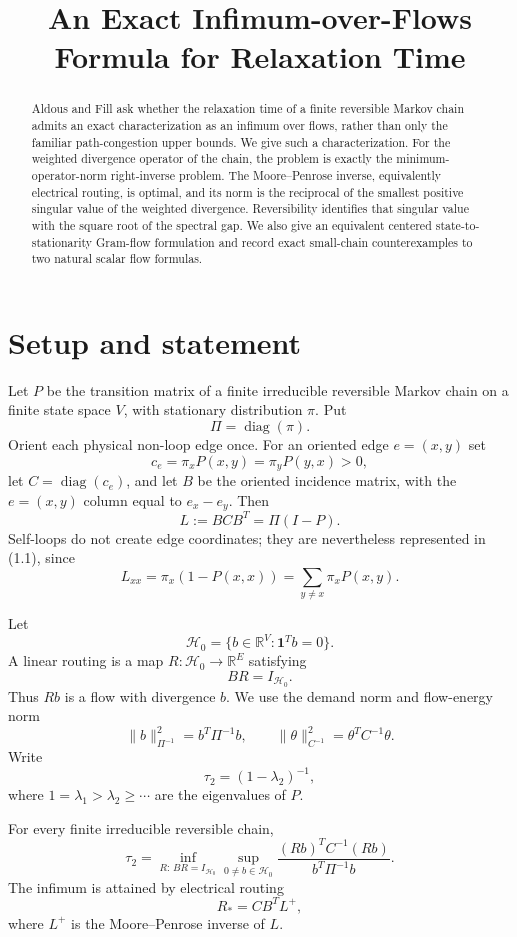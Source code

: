 \documentclass[11pt]{article}
\title{An Exact Infimum-over-Flows Formula for Relaxation Time}
\date{}
\newcommand{\R}{\mathbb{R}}
\newcommand{\cH}{\mathcal H}
\newcommand{\one}{\mathbf 1}
\begin{document}
\maketitle

\begin{abstract}
Aldous and Fill ask whether the relaxation time of a finite reversible Markov chain admits an exact characterization as an infimum over flows, rather than only the familiar path-congestion upper bounds. We give such a characterization. For the weighted divergence operator of the chain, the problem is exactly the minimum-operator-norm right-inverse problem. The Moore--Penrose inverse, equivalently electrical routing, is optimal, and its norm is the reciprocal of the smallest positive singular value of the weighted divergence. Reversibility identifies that singular value with the square root of the spectral gap. We also give an equivalent centered state-to-stationarity Gram-flow formulation and record exact small-chain counterexamples to two natural scalar flow formulas.
\end{abstract}

\section{Setup and statement}
Let $P$ be the transition matrix of a finite irreducible reversible Markov chain on a finite state space $V$, with stationary distribution $\pi$. Put
\[
\Pi=\operatorname{diag}(\pi).
\]
Orient each physical non-loop edge once. For an oriented edge $e=(x,y)$ set
\[
c_e=\pi_xP(x,y)=\pi_yP(y,x)>0,
\]
let $C=\operatorname{diag}(c_e)$, and let $B$ be the oriented incidence matrix, with the $e=(x,y)$ column equal to $e_x-e_y$. Then
\[
L:=BCB^T=\Pi(I-P).
\tag{1.1}
\]
Self-loops do not create edge coordinates; they are nevertheless represented in (1.1), since
\[
L_{xx}=\pi_x(1-P(x,x))=\sum_{y\ne x}\pi_xP(x,y).
\]

Let
\[
\cH_0=\{b\in\R^V:\one^Tb=0\}.
\]
A linear routing is a map $R:\cH_0\to\R^E$ satisfying
\[
BR=I_{\cH_0}.
\tag{1.2}
\]
Thus $Rb$ is a flow with divergence $b$. We use the demand norm and flow-energy norm
\[
\|b\|_{\Pi^{-1}}^2=b^T\Pi^{-1}b,
\qquad
\|\theta\|_{C^{-1}}^2=\theta^TC^{-1}\theta.
\]
Write
\[
\tau_2=(1-\lambda_2)^{-1},
\]
where $1=\lambda_1>\lambda_2\ge\cdots$ are the eigenvalues of $P$.

\begin{theorem}\label{thm:main}
For every finite irreducible reversible chain,
\[
\boxed{
\tau_2=
\inf_{R:\,BR=I_{\cH_0}}
\sup_{0\ne b\in\cH_0}
\frac{(Rb)^TC^{-1}(Rb)}{b^T\Pi^{-1}b}.
}
\tag{1.3}
\]
The infimum is attained by electrical routing
\[
\boxed{R_*=CB^TL^+,}
\tag{1.4}
\]
where $L^+$ is the Moore--Penrose inverse of $L$.
\end{theorem}
\end{document}

